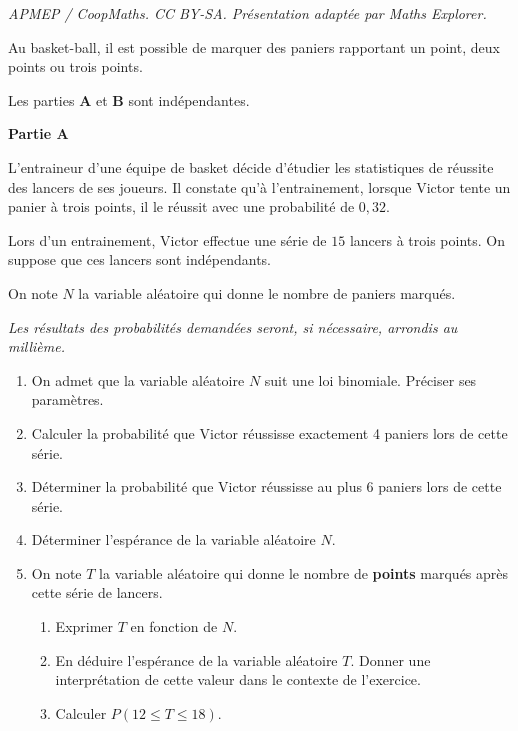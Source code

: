 \documentclass[10pt]{article}
\begin{document}
\noindent\textit{APMEP / CoopMaths. CC BY-SA. Présentation adaptée par Maths Explorer.}\par\medskip
\medskip

Au basket-ball, il est possible de marquer des paniers rapportant un point, deux points ou trois points.

Les parties \textbf{A} et \textbf{B} sont indépendantes.

\bigskip

\textbf{Partie A}

\medskip
L'entraineur d'une équipe de basket décide d'étudier les statistiques de réussite des lancers de ses joueurs. Il constate qu'à l'entrainement, lorsque Victor tente un panier à trois points, il le réussit avec une probabilité de $0,32$.

Lors d'un entrainement, Victor effectue une série de $15$ lancers à trois points. On suppose que ces lancers sont indépendants.

\medskip

On note $N$ la variable aléatoire qui donne le nombre de paniers marqués.

\medskip

\emph{Les résultats des probabilités demandées seront, si nécessaire, arrondis au millième.}

\begin{enumerate}
\item On admet que la variable aléatoire $N$ suit une loi binomiale. Préciser ses paramètres.
\item Calculer la probabilité que Victor réussisse exactement 4 paniers lors de cette série.
\item Déterminer la probabilité que Victor réussisse au plus 6 paniers lors de cette série.
\item Déterminer l'espérance de la variable aléatoire $N$.
\item On note $T$ la variable aléatoire qui donne le nombre de \textbf{points} marqués après cette série de lancers.
	\begin{enumerate}
		\item Exprimer $T$ en fonction de $N$.
		\item En déduire l'espérance de la variable aléatoire $T$. Donner une interprétation de cette valeur dans le contexte de l'exercice.
		\item Calculer $P(12 \leqslant T \leqslant 18)$.
	\end{enumerate}
\end{enumerate}
\end{document}

